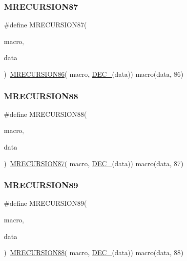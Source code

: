 \subsubsection{\texorpdfstring{MRECURSION87}{MRECURSION87}}
{\footnotesize\ttfamily \#define M\+R\+E\+C\+U\+R\+S\+I\+O\+N87(\begin{DoxyParamCaption}\item[{}]{macro,  }\item[{}]{data }\end{DoxyParamCaption})~\mbox{\hyperlink{group__group__sam0__utils__mrecursion_gac51f17bf8f61be0fe68a40cdaca97002}{M\+R\+E\+C\+U\+R\+S\+I\+O\+N86}}(  macro, \mbox{\hyperlink{group__group__sam0__utils__mrecursion_ga1d23d683797679dca8c3512a54a5dcae}{D\+E\+C\+\_\+}}(data))   macro(data, 86)}

\mbox{\label{group__group__sam0__utils__mrecursion_ga7a218f615f598fbbc92149ac191c3003}} 
\subsubsection{\texorpdfstring{MRECURSION88}{MRECURSION88}}
{\footnotesize\ttfamily \#define M\+R\+E\+C\+U\+R\+S\+I\+O\+N88(\begin{DoxyParamCaption}\item[{}]{macro,  }\item[{}]{data }\end{DoxyParamCaption})~\mbox{\hyperlink{group__group__sam0__utils__mrecursion_gac2d7de404d632efc644ba343ae3bdafc}{M\+R\+E\+C\+U\+R\+S\+I\+O\+N87}}(  macro, \mbox{\hyperlink{group__group__sam0__utils__mrecursion_ga1d23d683797679dca8c3512a54a5dcae}{D\+E\+C\+\_\+}}(data))   macro(data, 87)}

\mbox{\label{group__group__sam0__utils__mrecursion_ga4aaba445e78b860dbe24197f48bab4b2}} 
\subsubsection{\texorpdfstring{MRECURSION89}{MRECURSION89}}
{\footnotesize\ttfamily \#define M\+R\+E\+C\+U\+R\+S\+I\+O\+N89(\begin{DoxyParamCaption}\item[{}]{macro,  }\item[{}]{data }\end{DoxyParamCaption})~\mbox{\hyperlink{group__group__sam0__utils__mrecursion_ga7a218f615f598fbbc92149ac191c3003}{M\+R\+E\+C\+U\+R\+S\+I\+O\+N88}}(  macro, \mbox{\hyperlink{group__group__sam0__utils__mrecursion_ga1d23d683797679dca8c3512a54a5dcae}{D\+E\+C\+\_\+}}(data))   macro(data, 88)}


